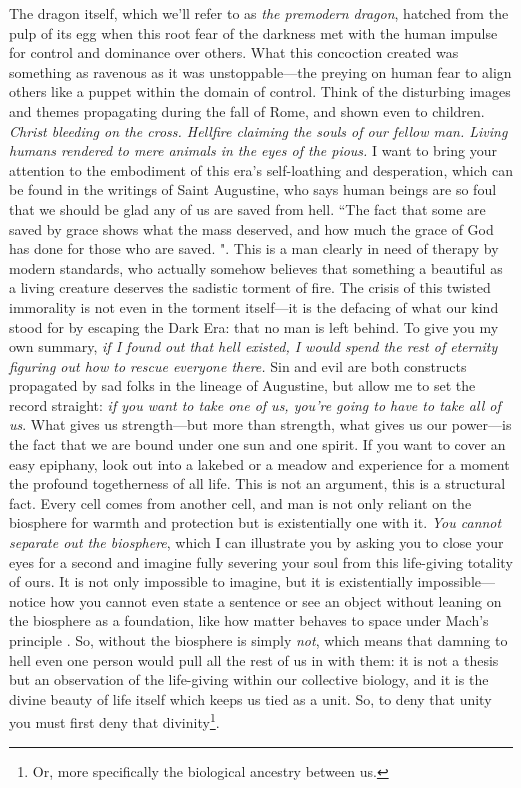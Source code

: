 The dragon itself, which we'll refer to as \textit{the premodern dragon}, hatched from the pulp of its egg when this root fear of the darkness met with the human impulse for control and dominance over others. What this concoction created was something as ravenous as it was unstoppable---the preying on human fear to align others like a puppet within the domain of control. Think of the disturbing images and themes propagating during the fall of Rome, and shown even to children. \textit{Christ bleeding on the cross. Hellfire claiming the souls of our fellow man. Living humans rendered to mere animals in the eyes of the pious.} I want to bring your attention to the embodiment of this era's self-loathing and desperation, which can be found in the writings of Saint Augustine, who says human beings are so foul that we should be glad any of us are saved from hell. ``The fact that some are saved by grace shows what the mass deserved, and how much the grace of God has done for those who are saved. \cite{augustine_enchiridion}". This is a man clearly in need of therapy by modern standards, who actually somehow believes that something a beautiful as a living creature deserves the sadistic torment of fire. 
The crisis of this twisted immorality is not even in the torment itself---it is the defacing of what our kind stood for by escaping the Dark Era: that no man is left behind. To give you my own summary, \textit{if I found out that hell existed, I would spend the rest of eternity figuring out how to rescue everyone there.} Sin and evil are both constructs propagated by sad folks in the lineage of Augustine, but allow me to set the record straight: \textit{if you want to take one of us, you're going to have to take all of us}. What gives us strength---but more than strength, what gives us our power---is the fact that we are bound under one sun and one spirit. If you want to cover an easy epiphany, look out into a lakebed or a meadow and experience for a moment the profound togetherness of all life. This is not an argument, this is a structural fact. Every cell comes from another cell, and man is not only reliant on the biosphere for warmth and protection but is existentially one with it. \textit{You cannot separate out the biosphere}, which I can illustrate you by asking you to close your eyes for a second and imagine fully severing your soul from this life-giving totality of ours. It is not only impossible to imagine, but it is existentially impossible---notice how you cannot even state a sentence or see an object without leaning on the biosphere as a foundation, like how matter behaves to space under Mach's principle \cite{Barbour1995}. So, without the biosphere is simply \textit{not}, which means that damning to hell even one person would pull all the rest of us in with them: it is not a thesis but an observation of the life-giving within our collective biology, and it is the divine beauty of life itself which keeps us tied as a unit. So, to deny that unity you must first deny that divinity\footnote{Or, more specifically the biological ancestry between us.}. 


